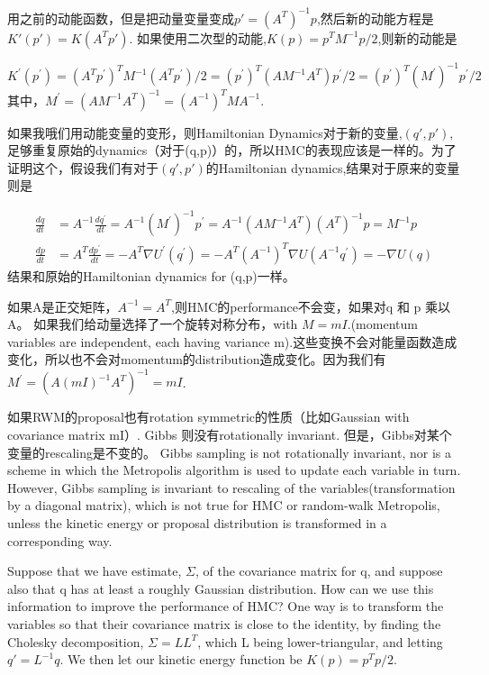 \documentclass[
]{book}
\theoremstyle{definition}
\theoremstyle{definition}
\theoremstyle{definition}
\theoremstyle{remark}
\begin{document}
用之前的动能函数，但是把动量变量变成\(p'=(A^T)^{-1}p\),然后新的动能方程是\(K'(p')=K(A^Tp')\). 如果使用二次型的动能,\(K(p)=p^{T} M^{-1} p / 2\),则新的动能是

\[
K^{\prime}\left(p^{\prime}\right)=\left(A^{T} p^{\prime}\right)^{T} M^{-1}\left(A^{T} p^{\prime}\right) / 2=\left(p^{\prime}\right)^{T}\left(A M^{-1} A^{T}\right) p^{\prime} / 2=\left(p^{\prime}\right)^{T}\left(M^{\prime}\right)^{-1} p^{\prime} / 2
\]
其中，\(M^{\prime}=\left(A M^{-1} A^{T}\right)^{-1}=\left(A^{-1}\right)^{T} M A^{-1}\).

如果我哦们用动能变量的变形，则Hamiltonian Dynamics对于新的变量,\((q',p')\),足够重复原始的dynamics（对于(q,p)）的，所以HMC的表现应该是一样的。为了证明这个，假设我们有对于\((q',p')\)的Hamiltonian dynamics,结果对于原来的变量则是

\[
\begin{aligned} \frac{d q}{d t} &=A^{-1} \frac{d q^{\prime}}{d t}=A^{-1}\left(M^{\prime}\right)^{-1} p^{\prime}=A^{-1}\left(A M^{-1} A^{T}\right)\left(A^{T}\right)^{-1} p=M^{-1} p \\ \frac{d p}{d t} &=A^{T} \frac{d p^{\prime}}{d t}=-A^{T} \nabla U^{\prime}\left(q^{\prime}\right)=-A^{T}\left(A^{-1}\right)^{T} \nabla U\left(A^{-1} q^{\prime}\right)=-\nabla U(q) \end{aligned}
\]
结果和原始的Hamiltonian dynamics for (q,p)一样。

如果A是正交矩阵，\(A^{-1}=A^{T}\),则HMC的performance不会变，如果对q 和 p 乘以A。
如果我们给动量选择了一个旋转对称分布，with \(M=mI\).(momentum variables are independent, each having variance m).这些变换不会对能量函数造成变化，所以也不会对momentum的distribution造成变化。因为我们有\(M^{\prime}=\left(A(m I)^{-1} A^{T}\right)^{-1}=m I\).

如果RWM的proposal也有rotation symmetric的性质（比如Gaussian with covariance matrix mI）. Gibbs 则没有rotationally invariant. 但是，Gibbs对某个变量的rescaling是不变的。 Gibbs sampling is not rotationally invariant, nor is a scheme in which the Metropolis algorithm is used to update each variable in turn. However, Gibbs sampling is invariant to rescaling of the variables(transformation by a diagonal matrix), which is not true for HMC or random-walk Metropolis, unless the kinetic energy or proposal distribution is transformed in a corresponding way.

Suppose that we have estimate, \(\Sigma\), of the covariance matrix for q, and suppose also that q has at least a roughly Gaussian distribution. How can we use this information to improve the performance of HMC? One way is to transform the variables so that their covariance matrix is close to the identity, by finding the Cholesky decomposition, \(\Sigma=LL^T\), which L being lower-triangular, and letting \(q'=L^{-1}q\). We then let our kinetic energy function be \(K(p)=p^Tp/2\).
\end{document}
